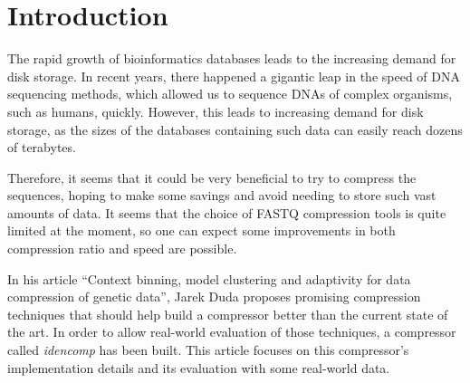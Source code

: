 \section{Introduction}\label{sec:introduction}

The rapid growth of bioinformatics databases leads to the increasing demand
for disk storage.
In recent years, there happened a gigantic leap in the speed of DNA
sequencing methods, which allowed us to sequence DNAs of complex organisms,
such as humans, quickly\cite{Ashley2016}.
However, this leads to increasing demand for disk storage, as the sizes of
the databases containing such data can easily reach dozens of terabytes.

Therefore, it seems that it could be very beneficial to try to compress the
sequences, hoping to make some savings and avoid needing to store such vast
amounts of data.
It seems that the choice of FASTQ compression tools is quite
limited at the moment, so one can expect some improvements in both
compression ratio and speed are possible.

In his article ``Context binning, model clustering and adaptivity for data
compression of genetic data''\cite{https://doi.org/10.48550/arxiv.2201.05028},
Jarek Duda proposes promising compression techniques that should help build a
compressor better than the current state of the art.
In order to allow real-world evaluation of those
techniques, a compressor called \emph{idencomp} has been built.
This article focuses on this compressor's implementation details and its
evaluation with some real-world data.
